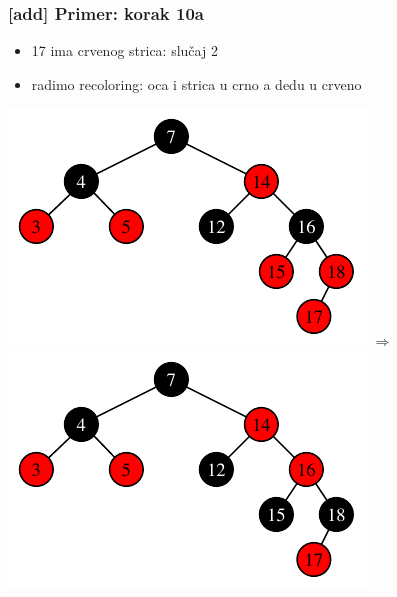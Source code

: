 \documentclass[compress,aspectratio=169]{beamer}
\begin{document}
\begin{frame}[fragile]
  \frametitle{[add] Primer: korak 10a}
  \begin{itemize}
    \item 17 ima crvenog strica: slučaj 2
    \item radimo recoloring: oca i strica u crno a dedu u crveno
  \end{itemize}
  \begin{center}
    \includegraphics[scale=0.8]{asp-11-add-15.pdf} $\Rightarrow$
    \includegraphics[scale=0.8]{asp-11-add-16.pdf}
  \end{center}
\end{frame}
\end{document}
